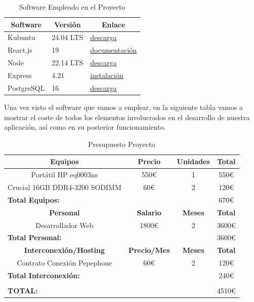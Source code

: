 \begin{table}[H]
	\begin{center}
		\bgroup
		\def\arraystretch{1.5}
		\begin{tabular}{| p{4cm} | p{4cm} | p{4cm} |}
			\hline
			\multicolumn{1}{|c|}{\textbf{Software}} & \multicolumn{1}{|c|}{\textbf{Versión}} &  \multicolumn{1}{|c|}{\textbf{Enlace}} \\ \hline
			Kubuntu & 24.04 LTS & \href{https://kubuntu.org/getkubuntu/}{descarga} \\ \hline
			React.js & 19 & \href{https://react.dev/}{documentación} \\ \hline
			Node & 22.14 LTS & \href{https://nodejs.org/es/download}{descarga} \\ \hline
			Express & 4.21 & \href{https://expressjs.com/es/starter/installing.html}{instalación} \\ \hline
			PostgreSQL & 16 & \href{https://www.postgresql.org/download/}{descarga} \\ \hline
		\end{tabular}	
		\egroup
		\caption{Software Empleado en el Proyecto}
	\end{center}
\end{table}

Una vez visto el software que vamos a emplear, en la siguiente tabla vamos a mostrar el coste de todos los elementos involucrados en el desarrollo de nuestra aplicación, así como en su posterior funcionamiento.

\begin{table}[H]
	\begin{center}
		\bgroup
		\def\arraystretch{1.5}
		\begin{tabular}{| c | c | c | c |}
			\hline
			\textbf{Equipos} & \textbf{Precio} &  \textbf{Unidades} & \textbf{Total} \\ \hline
			Portátil  HP eq0003ns & 550€ & 1 & 550€ \\ \hline
			Crucial 16GB DDR4-3200 SODIMM & 60€ & 2 & 120€ \\ \hline
			\multicolumn{3}{|l|}{\textbf{Total Equipos:}} & 670€ \\ \hline
			\textbf{Personal} & \textbf{Salario} &  \textbf{Meses} & \textbf{Total} \\ \hline
			Desarrollador Web & 1800€ & 2 & 3600€ \\ \hline
			\multicolumn{3}{|l|}{\textbf{Total Personal:}} & 3600€ \\ \hline
			\textbf{Interconexión/Hosting} & \textbf{Precio/Mes} &  \textbf{Meses} & \textbf{Total} \\ \hline
			Contrato Conexión Pepephone & 60€ & 2 & 120€ \\ \hline
			\multicolumn{3}{|l|}{\textbf{Total Interconexión:}} & 240€ \\ \hline
			\multicolumn{4}{|l|}{\textbf{}}\\ \hline
			\multicolumn{3}{|l|}{\textbf{TOTAL:}} & 4510€ \\ \hline			
		\end{tabular}	
		\egroup
		\caption{Presupuesto Proyecto}
	\end{center}
\end{table}

